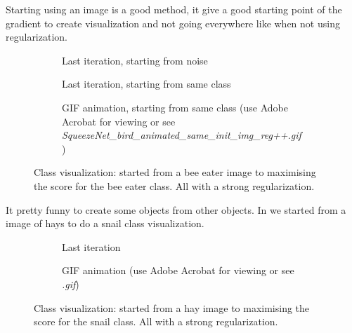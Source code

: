Starting using an image is a good method, it give a good starting point of the gradient to create visualization and not going everywhere like when not using regularization.
\begin{figure}[H]
    \centering
    \begin{subfigure}{.33\textwidth}
        \centering
        \caption{Last iteration, starting from noise}
        \label{fig:class_viz_start_image:png_noise}
    \end{subfigure}%
    \begin{subfigure}{.33\textwidth}
        \centering
        \caption{Last iteration, starting from same class}
        \label{fig:class_viz_start_image:png}
    \end{subfigure}%
    \begin{subfigure}{.33\textwidth}
        \centering
        \caption{GIF animation, starting from same class (use Adobe Acrobat for viewing or see \textit{SqueezeNet\_bird\_animated\_same\_init\_img\_reg++.gif})}
        \label{fig:class_viz_start_image:gif}
    \end{subfigure}

    \caption{Class visualization: started from a bee eater image to maximising the score for the bee eater class. All with a strong regularization.}
    \label{fig:class_viz_start_image}
\end{figure}


It pretty funny to create some objects from other objects. In  we started from a image of hays to do a snail class visualization.
\begin{figure}[H]
    \centering
    \begin{subfigure}{.5\textwidth}
        \centering
        \caption{Last iteration}
        \label{fig:class_viz_start_image_dif:png}
    \end{subfigure}%
    \begin{subfigure}{.5\textwidth}
        \centering
        \caption{GIF animation (use Adobe Acrobat for viewing or see \textit{.gif})}
        \label{fig:class_viz_start_image_dif:gif}
    \end{subfigure}

    \caption{Class visualization: started from a hay image to maximising the score for the snail class. All with a strong regularization.}
    \label{fig:class_viz_start_image_dif}
\end{figure}

